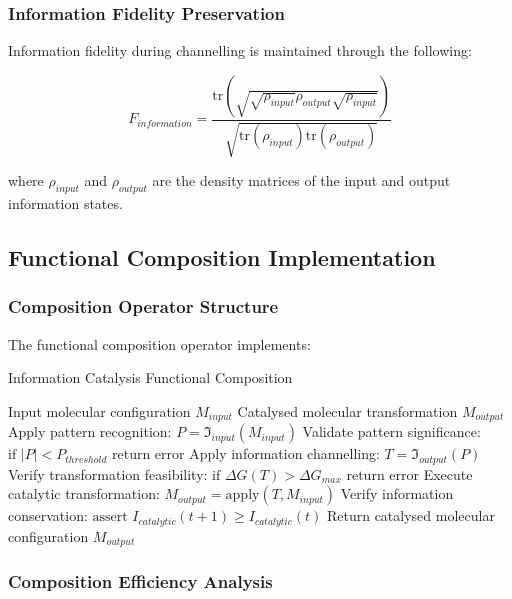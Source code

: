 \documentclass[12pt,a4paper]{article}
\begin{document}
\subsubsection{Information Fidelity Preservation}

Information fidelity during channelling is maintained through the following:

\begin{equation}
F_{information} = \frac{\text{tr}(\sqrt{\sqrt{\rho_{input}} \rho_{output} \sqrt{\rho_{input}}})}{\sqrt{\text{tr}(\rho_{input}) \text{tr}(\rho_{output})}}
\end{equation}

where $\rho_{input}$ and $\rho_{output}$ are the density matrices of the input and output information states.

\subsection{Functional Composition Implementation}

\subsubsection{Composition Operator Structure}

The functional composition operator implements:

\begin{algorithm}[H]
\caption{Information Catalysis Functional Composition}
\begin{algorithmic}[1]
\REQUIRE Input molecular configuration $M_{input}$
\ENSURE Catalysed molecular transformation $M_{output}$
\STATE Apply pattern recognition: $P = \mathfrak{I}_{input}(M_{input})$
\STATE Validate pattern significance: $\text{if } |P| < P_{threshold} \text{ return error}$
\STATE Apply information channelling: $T = \mathfrak{I}_{output}(P)$
\STATE Verify transformation feasibility: $\text{if } \Delta G(T) > \Delta G_{max} \text{ return error}$
\STATE Execute catalytic transformation: $M_{output} = \text{apply}(T, M_{input})$
\STATE Verify information conservation: $\text{assert } I_{catalytic}(t+1) \geq I_{catalytic}(t)$
\STATE Return catalysed molecular configuration $M_{output}$
\end{algorithmic}
\end{algorithm}

\subsubsection{Composition Efficiency Analysis}
\end{document}
